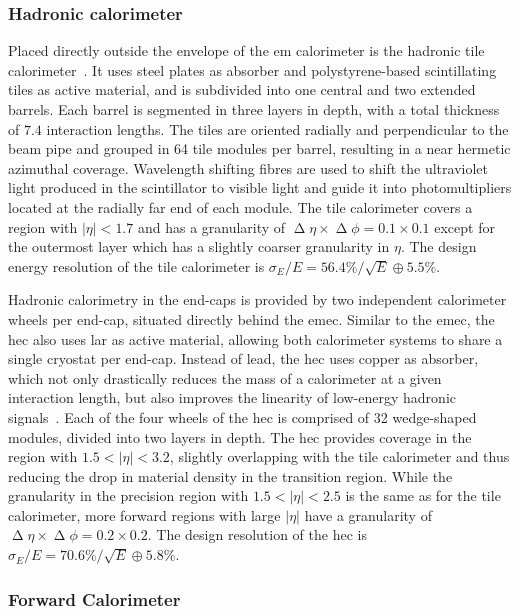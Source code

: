 \subsubsection{Hadronic calorimeter}

Placed directly outside the envelope of the \gls{em} calorimeter is the hadronic tile calorimeter~\cite{Aad:2008zzm}.
It uses steel plates as absorber and polystyrene-based scintillating tiles as active material, and is subdivided into one central and two extended barrels.
Each barrel is segmented in three layers in depth, with a total thickness of $7.4$ interaction lengths.
The tiles are oriented radially and perpendicular to the beam pipe and grouped in 64 tile modules per barrel, resulting in a near hermetic azimuthal coverage.
Wavelength shifting fibres are used to shift the ultraviolet light produced in the scintillator to visible light and guide it into photomultipliers located at the radially far end of each module.
The tile calorimeter covers a region with $\vert\eta\vert <1.7$ and has a granularity of $\upDelta \eta \times \upDelta \phi = 0.1 \times 0.1$ except for the outermost layer which has a slightly coarser granularity in $\eta$.
The design energy resolution of the tile calorimeter is $\sigma_E / E = 56.4\% / \sqrt{E} \oplus 5.5\%$.

Hadronic calorimetry in the end-caps is provided by two independent calorimeter wheels per end-cap, situated directly behind the \gls{emec}.
Similar to the \gls{emec}, the \gls{hec} also uses \gls{lar} as active material, allowing both calorimeter systems to share a single cryostat per end-cap.
Instead of lead, the \gls{hec} uses copper as absorber, which not only drastically reduces the mass of a calorimeter at a given interaction length, but also improves the linearity of low-energy hadronic signals~\cite{Lee:2637852}.
Each of the four wheels of the \gls{hec} is comprised of 32 wedge-shaped modules, divided into two layers in depth.
The \gls{hec} provides coverage in the region with $1.5 < \vert\eta\vert <3.2$, slightly overlapping with the tile calorimeter and thus reducing the drop in material density in the transition region.
While the granularity in the precision region with $1.5 < \vert\eta\vert <2.5$ is the same as for the tile calorimeter, more forward regions with large $\vert\eta\vert$ have a granularity of $\upDelta \eta \times \upDelta \phi = 0.2 \times 0.2$.
The design resolution of the \gls{hec} is $\sigma_E / E = 70.6\% / \sqrt{E} \oplus 5.8\%$.

\subsubsection{Forward Calorimeter}

